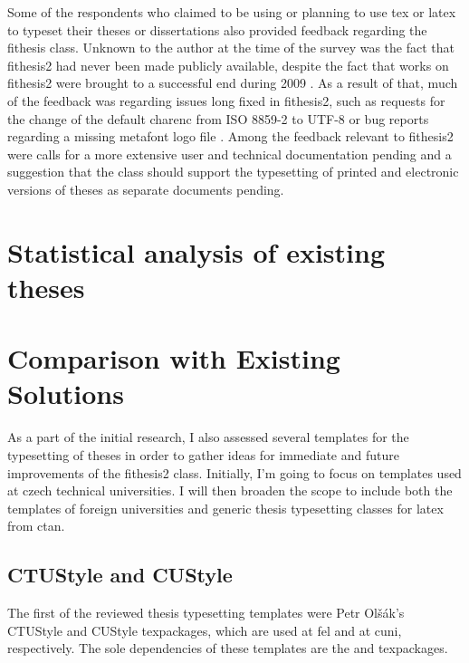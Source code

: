     Some of the respondents who claimed to be using or planning to use \gls{tex} or \gls{latex} to typeset their theses or dissertations also provided feedback regarding the fithesis class. Unknown to the author at the time of the survey was the fact that fithesis2 had never been made publicly available, despite the fact that works on fithesis2 were brought to a successful end during 2009 \cite{Filipcik09}. As a result of that, much of the feedback was regarding issues long fixed in fithesis2, such as requests for the change of the default \gls{charenc} from ISO 8859-2 to UTF-8 \cite[section 4.1]{Filipcik09} or bug reports regarding a missing metafont logo file \cite{fithesis2@fbd7a25}. Among the feedback relevant to fithesis2 were calls for a more extensive user and technical documentation \gls{pending} and a suggestion that the class should support the typesetting of printed and electronic versions of theses as separate documents \gls{pending}.

    \section{Statistical analysis of existing theses}
    \blindtext

    \section{Comparison with Existing Solutions}
    As a part of the initial research, I also assessed several templates for the typesetting of theses in order to gather ideas for immediate and future improvements of the fithesis2 class. Initially, I'm going to focus on templates used at czech technical universities. I will then broaden the scope to include both the templates of foreign universities and generic thesis typesetting classes for \gls{latex} from \gls{ctan}.

      \subsection{CTUStyle and CUStyle}
      The first of the reviewed thesis typesetting templates were Petr Olšák's CTUStyle \cite{ctustyle} and CUStyle \cite{custyle} \glspl{texpackage}, which are used at \gls{fel} and at \gls{cuni}, respectively. The sole dependencies of these templates are the  and  \glspl{texpackage}.

